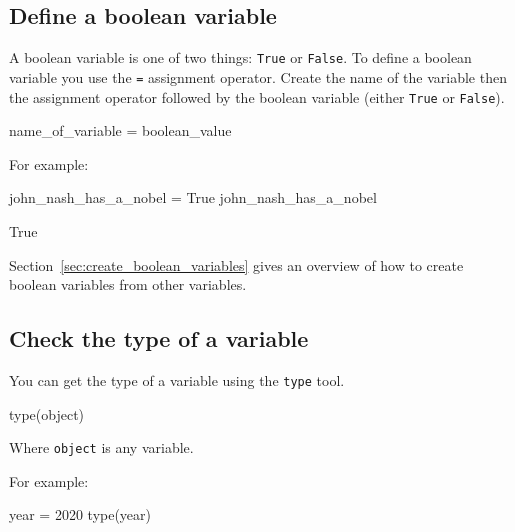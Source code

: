 \subsection{Define a boolean variable}
\label{\detokenize{building-tools/01-variables-conditionals-loops/how/main:define-a-boolean-variable}}

A boolean variable is one of two things: \texttt{True} or \texttt{False}. To define a boolean
variable you use the \texttt{=} assignment operator.
Create the name of the variable then the assignment operator followed by the
boolean variable (either \texttt{True} or \texttt{False}).


\begin{api}
name_of_variable = boolean_value
\end{api}



For example:




\begin{pyin}
john_nash_has_a_nobel = True
john_nash_has_a_nobel
\end{pyin}





\begin{pyin}
True
\end{pyin}


\begin{note}
Section~\ref{sec:create_boolean_variables} gives an overview of how to create boolean
variables from other variables.
\end{note}



\subsection{Check the type of a variable}

You can get the type of a variable using the \texttt{type} tool.


\begin{api}
type(object)
\end{api}


Where \texttt{object} is any variable.



For example:




\begin{pyin}
year = 2020
type(year)
\end{pyin}





